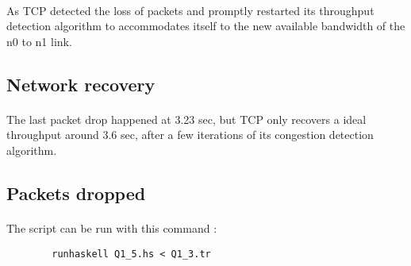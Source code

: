 \documentclass[a4paper]{article}
\begin{document}
    \paragraph{}As TCP detected the loss of packets and promptly restarted its
throughput detection algorithm to accommodates itself to the new available
bandwidth of the n0 to n1 link.

   \subsection{Network recovery}

   \paragraph{}The last packet drop happened at 3.23 sec, but TCP only recovers
a ideal throughput around 3.6 sec, after a few iterations of its congestion
detection algorithm.

   \subsection{Packets dropped}

   \paragraph{}

    \paragraph{}The script can be run with this command :
    \begin{verbatim}
        runhaskell Q1_5.hs < Q1_3.tr
    \end{verbatim}
\end{document}
